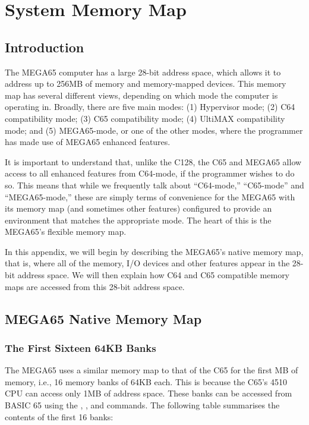 \chapter{System Memory Map}
\label{cha:memory-map}
\section{Introduction}

The MEGA65 computer has a large 28-bit address space, which allows it
to address up to 256MB of memory and memory-mapped devices.
This memory map has several different views, depending on which mode
the computer is operating in. Broadly, there are five main modes:
(1) Hypervisor mode; (2) C64 compatibility mode; (3) C65 compatibility mode; (4) UltiMAX
compatibility mode; and (5) MEGA65-mode, or one of the other modes,
where the programmer has made use of MEGA65 enhanced features.

It is important to understand that, unlike the C128, the C65 and
MEGA65 allow access to all enhanced features from C64-mode, if the
programmer wishes to do so.  This means that while we frequently talk
about ``C64-mode,'' ``C65-mode'' and ``MEGA65-mode,'' these are simply
terms of convenience for the MEGA65 with its memory map (and sometimes
other features) configured to provide an environment that matches
the appropriate mode.  The heart of this is the MEGA65's flexible
memory map.

In this appendix, we will begin by describing the MEGA65's native
memory map, that is, where all of the memory, I/O devices and other
features appear in the 28-bit address space. We will then explain how
C64 and C65 compatible memory maps are accessed from this 28-bit
address space.

\newpage

\section{MEGA65 Native Memory Map}

\subsection{The First Sixteen 64KB Banks}

The MEGA65 uses a similar memory map to that of the C65 for the first
MB of memory, i.e., 16 memory banks of 64KB each.
This is because the C65's 4510 CPU can access only 1MB
of address space.  These banks can be accessed from BASIC 65 using the
,
,  and 
commands.  The following table summarises the contents of the first
16 banks:


